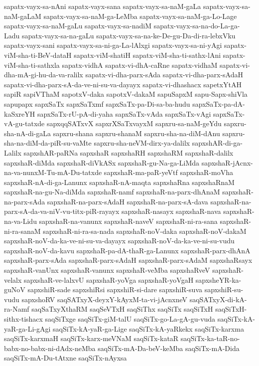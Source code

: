 {sapatx-vayx-sa-nAni
sapatx-vayx-sana
sapatx-vayx-sa-naM-gaLa
sapatx-vayx-sa-naM-gaLaM
sapatx-vayx-sa-naM-ga-LeMba
sapatx-vayx-sa-naM-ga-Lo-Lage
sapatx-vayx-sa-naM-gaLu
sapatx-vayx-sa-nadiM
sapatx-vayx-sa-na-do-La-ga-Ladu
sapatx-vayx-sa-na-gaLu
sapatx-vayx-sa-na-ke-De-gu-Da-di-ra-lebxVku
sapatx-vayx-sani
sapatx-vayx-sa-ni-ga-La-lAlxgi
sapatx-vayx-sa-ni-yAgi
sapatx-viM-sha-ti-BeV-dataH
sapatx-viM-shatiH
sapatx-viM-sha-ti-sathx-lAni
sapatx-viM-sha-ti-sathxla
sapatx-vidhA
sapatx-vi-dhA-caRne
sapatx-vidhaM
sapatx-vi-dha-mA-gi-hu-da-va-ralilx
sapatx-vi-dha-parx-sAda
sapatx-vi-dha-parx-sAdaH
sapatx-vi-dha-parx-sA-da-ve-ni-su-va-dayayx
sapatx-vi-dhashacx
sapetxYtAH
sapiR
sapiVThaM
sapotxV-daka
sapotxV-dakaM
sapuSapxM
sapu-Sapx-shiVla
sapupapx
sapxSaTx
sapxSaTxmf
sapxSaTx-pa-Di-sa-ba-hudu
sapxSaTx-pa-dA-kaSxreYH
sapxSaTx-rU-pA-di-yaha
sapxSaTx-vAda
sapxSaTx-vAgi
sapxSaTx-vA-gu-tatxde
sapxqqSATxvX
sapxrXSaTxvayxM
sapxru-sa-naM-geYdu
sapxru-sha-nA-di-gaLa
sapxru-shana
sapxru-shanaM
sapxru-sha-na-diM-dAnu
sapxru-sha-na-diM-da-piR-su-vaMte
sapxru-sha-neVM-dirx-ya-dalilx
sapxshAR-di-ga-Lalilx
sapxshAR-paRNa
sapxshaR
sapxshaRH
sapxshaRM
sapxshaR-dalilx
sapxshaR-diMda
sapxshaR-diVkASx
sapxshaR-gu-Na-ga-LiMda
sapxshaR-jAcnx-na-va-nunxM-Tu-mA-Du-tatxde
sapxshaR-ma-paR-yeVtf
sapxshaR-moVha
sapxshaR-nA-di-ga-Lanunx
sapxshaR-nA-maqta
sapxshaRna
sapxshaRnaM
sapxshaR-na-gu-Na-diMda
sapxshaR-namf
sapxshaR-na-parx-dhAnaM
sapxshaR-na-parx-sAda
sapxshaR-na-parx-sAdaH
sapxshaR-na-parx-sA-dava
sapxshaR-na-parx-sA-da-va-niV-vu-titx-piR-rayayx
sapxshaR-nasayx
sapxshaR-nava
sapxshaR-na-va-Lidu
sapxshaR-na-vanunx
sapxshaR-naveV
sapxshaR-ni-ra-sana
sapxshaR-ni-ra-sanaM
sapxshaR-ni-ra-sa-nada
sapxshaR-noV-daka
sapxshaR-noV-dakaM
sapxshaR-noV-da-ka-ve-ni-su-va-dayayx
sapxshaR-noV-da-ka-ve-ni-su-vudu
sapxshaR-noV-da-kavu
sapxshaR-pa-dA-thaR-ga-Lanunx
sapxshaR-parx-dhAnA
sapxshaR-parx-sAda
sapxshaR-parx-sAdaH
sapxshaR-parx-sAdaM
sapxshaRsayx
sapxshaR-vanUnx
sapxshaR-vanunx
sapxshaR-veMba
sapxshaRveV
sapxshaR-velalx
sapxshaR-ve-lalxvU
sapxshaR-yoVga
sapxshaR-yoVgaH
sapxsheYR-ka-guNoV
sapxshiR-sade
sapxshiRsi
sapxshiR-si-dare
sapxshiR-suva
sapxshiR-su-vudu
sapxshoRV
saqSATxyX-deyxY-kAyxM-ta-vi-jAcnxneV
saqSATxyX-di-kA-ra-Namf
saqSaTxyXthaRM
saqSeVTxH
saqSiThx
saqSiTx
saqSiTxH
saqSiTxH-sithx-tishacx
saqSiTxge
saqSiTx-giM-talU
saqSiTx-go-La-gA-gu-vuda
saqSiTx-kA-yaR-ga-Li-gAgi
saqSiTx-kA-yaR-ga-Lige
saqSiTx-kA-yaRkekx
saqSiTx-karxma
saqSiTx-karxmaH
saqSiTx-karx-meVNaM
saqSiTx-kataR
saqSiTx-ka-taR-no-babx-no-babx-ni-dAdx-neMba
saqSiTx-mA-Da-beV-keMba
saqSiTx-mA-Dida
saqSiTx-mA-Du-tAtxne
saqSiTx-nAyxsa
}
